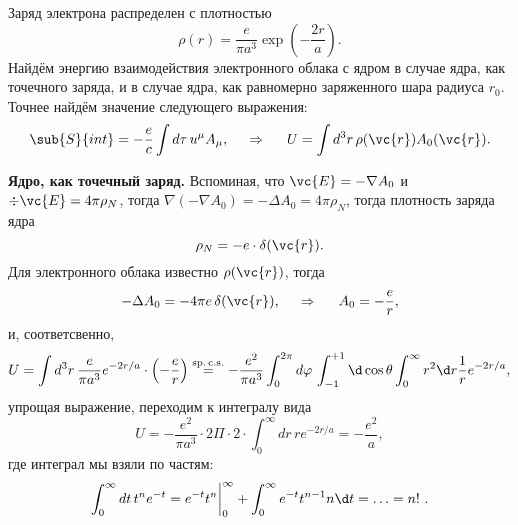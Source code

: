 
Заряд электрона распределен с плотностью
\begin{equation*}
    \rho(r) = \frac{e}{\pi a^3} \exp\left(-\frac{2r}{a}\right).
\end{equation*}
Найдём энергию взаимодействия электронного облака с ядром в случае ядра, как точечного заряда, и в случае ядра, как равномерно заряженного шара  радиуса $r_0$. Точнее найдём значение следующего выражения:
\begin{equation*}
    \sub{S}{int} = - \frac{e}{c} \int d \tau\, u^\mu A_\mu,
    \hspace{0.5cm} \Rightarrow \hspace{0.5cm}
    U = \int d^3 r\, \rho(\vc{r}) A_0 (\vc{r}).
\end{equation*}


\textbf{Ядро, как точечный заряд.} Вспоминая, что $\vc{E} = - \nabla A_0$ и $\div \vc{E} = 4 \pi \rho_N$, тогда $\nabla(-\nabla A_0) = - \Delta A_0 = 4 \pi \rho_N$, тогда плотность заряда ядра
\begin{equation*}
    \rho_N = -e \cdot \delta(\vc{r}).
\end{equation*}
Для электронного облака известно $\rho(\vc{r})$, тогда
\begin{equation*}
    - \Delta A_0 = - 4 \pi e \, \delta(\vc{r}),
    \hspace{0.5cm} \Rightarrow \hspace{0.5cm}
    A_0 = - \frac{e}{r}, 
\end{equation*}
и, соответсвенно,
\begin{equation*}
    U = \int d^3 r\, 
    \frac{e}{\pi a^3} e^{-2r/a} \cdot \left(-\frac{e}{r}\right) \overset{\mathrm{sp.\, c.s.}}{=}
    - \frac{e^2}{\pi a^3} \int_{0}^{2\pi} d \varphi\, \int_{-1}^{+1} \d \cos \theta \int_{0}^{\infty} r^2 \d r \frac{1}{r} e^{-2r/a},
\end{equation*}
упрощая выражение, переходим к интегралу вида
\begin{equation*}
    U = - \frac{e^2}{\pi a^3} \cdot 2 \Pi \cdot 2  \cdot \int_{0}^{\infty}dr\, r e^{-2r/a}
    = - \frac{e^2}{a}
    ,
\end{equation*}
где интеграл мы взяли по частям:
\begin{equation*}
    \int_{0}^{\infty} dt\, t^n e^{-t} = e^{-t} t^n \bigg|_{0}^{\infty} + \int_{0}^{\infty} e^{-t} t^{n-1} n \d t = \ldots = n!\ .
\end{equation*}

